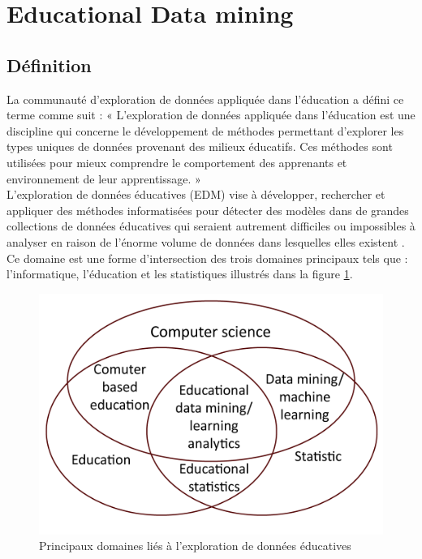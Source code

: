     \section{Educational Data mining}
    \subsection{Définition}
    La communauté d'exploration de données appliquée dans l'éducation a défini ce terme comme suit : 
    « L'exploration de données appliquée dans l'éducation est une discipline qui concerne le développement de méthodes
     permettant d'explorer les types uniques de données provenant des milieux éducatifs. Ces méthodes sont utilisées 
     pour mieux comprendre le comportement des apprenants et environnement de leur apprentissage. » \cite{state_of_educational_data_mining_in_2009_a_review_and_future_visions} \\
    L'exploration de données éducatives (EDM) vise à développer, rechercher et appliquer des méthodes informatisées
     pour détecter des modèles dans de grandes collections de données éducatives qui seraient autrement difficiles 
     ou impossibles à analyser en raison de l'énorme volume de données dans lesquelles elles existent \cite{Educational_data_mining_a_survey_from_1995_to_2005}. \\
    Ce domaine est une forme d'intersection des trois domaines principaux tels que : l'informatique, l'éducation 
    et les statistiques illustrés dans la figure \ref{domaine_exploration_données}.

    \begin{figure}[H]
		\begin{center}
			\includegraphics[width=\textwidth]{images/chapitre1/Principaux domaines liés à l'exploration de données éducatives}
		\end{center}
    \caption{Principaux domaines liés à l'exploration de données éducatives}
    \label{domaine_exploration_données}
    \end{figure}

